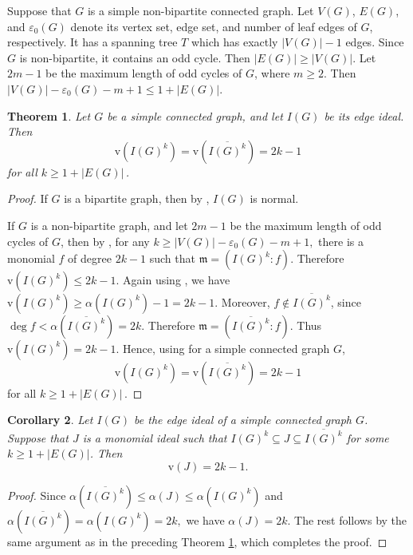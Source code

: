 \documentclass[11pt,reqno,a4paper]{amsart}
\newtheorem{theorem}{Theorem}[section]
\newtheorem{corollary}[theorem]{Corollary}
\theoremstyle{definition}
\begin{document}
\noindent Suppose that \(G\) is a simple non-bipartite connected graph. Let \(V(G)\), \(E(G)\), and \(\varepsilon_0(G)\) denote its vertex set, edge set, and number of leaf edges of \(G\), respectively. It has a spanning tree \(T\) which has exactly \(|V(G)|-1\) edges.  Since \(G\) is non-bipartite, it contains an odd cycle. Then
\(
|E(G)| \ge |V(G)|.
\)
Let \(2m-1\) be the maximum length of odd cycles of \(G\), where \(m \ge 2\). Then
\(
|V(G)| - \varepsilon_0(G) - m + 1 \le 1 + |E(G)|.
\)


\begin{theorem}\label{prop:v-stability}
Let $G$ be a simple connected graph, and let $I(G)$ be its edge ideal. Then
\[
\mathrm{v}(I(G)^k)=\mathrm{v}(\overline{I(G)^k})=2k-1
\]
for all
\(
k\ge 1+|E(G)|\,
\).

\end{theorem}

\begin{proof}
If $G$ is a bipartite graph, then by \cite[Proposition 2.1]{SimisVasconcelosVillarreal98}, $I(G)$ is normal.

\noindent If $G$ is a non-bipartite graph, and let $2m-1$ be the maximum length of odd cycles of $G$, then by \cite[Lemma 3.1]{MauTrung21},  for any
\(
k\ge |V(G)|-\varepsilon_0(G)-m+1,
\)
there is a monomial $f$ of degree $2k-1$ such that
\(
\mathfrak m = (I(G)^k:f)
\).
Therefore
\(
\mathrm{v}(I(G)^k)\le 2k-1.
\)
Again using \cite[Lemma 3.1]{BiswasMandalSaha26} , we have
\(
\mathrm{v}(I(G)^k)\ge \alpha(I(G)^k)-1=2k-1.
\)
Moreover, $f\notin \overline{I(G)^k}$, since $\deg f < \alpha(\overline{I(G)^k})=2k$. Therefore
\(
\mathfrak m = (\overline{I(G)^k}:f).
\)
Thus
\(
\mathrm{v}(I(G)^k)=2k-1.
\)
Hence, using \cite[Theorem 5.2]{BiswasMandalSaha26}  for a simple connected graph $G$,
\[
\mathrm{v}(I(G)^k)=\mathrm{v}(\overline{I(G)^k})=2k-1
\]
for all
\(
k\ge 1+|E(G)|\,
\).
\end{proof}







\begin{corollary}

Let \(I(G)\) be the edge ideal of a simple connected graph \(G\). Suppose that \(J\) is a monomial ideal such that
\(
I(G)^k\subseteq J\subseteq \overline{I(G)^k}
\)
for some \(k\geq 1+|E(G)|\). Then
\[
\mathrm{v}(J)=2k-1.
\]
\end{corollary}

\begin{proof}
Since
\(
\alpha(\overline{I(G)^k})\leq \alpha(J)\leq \alpha(I(G)^k)
\)
and
\(
\alpha(\overline{I(G)^k})=\alpha(I(G)^k)=2k,
\)
we have \(\alpha(J)=2k\).
The rest follows by the same argument as in the preceding Theorem \ref{prop:v-stability}, which completes the proof.
\end{proof}
\end{document}
